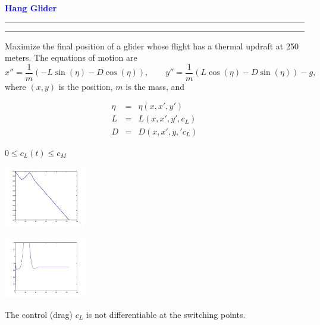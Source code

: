 \documentclass{seminar}
\newcommand{\redstripe}{\textcolor{red}{\hrule height 2.0pt\hfil}
             \vspace{-1.8pt}
             \textcolor{red}{\hrule height 1.0pt\hfil}
}
\newcommand{\heading}[1]{%
   \centerline{\textcolor{blue}{\textbf{#1}}}%
    \redstripe%
    \bigskip
}
\begin{document}
\begin{slide}

\heading{Hang Glider}

Maximize the final position of a glider whose flight has
a thermal updraft at 250 meters.
The equations of motion are
\[
x''  =  \frac{1}{m}(-L\sin (\eta )-D\cos (\eta )) , \qquad
y''  =  \frac{1}{m}(L\cos (\eta )-D\sin (\eta )) - g ,
\]
where $ ( x, y ) $ is the position, $m$ is the mass, and

\begin{minipage}[b]{.30\linewidth}
\begin{small}
\begin{eqnarray*}
\eta &=& \eta (x,x',y') \\
L    &=& L(x,x',y',c_L) \\
D    &=& D(x,x',y,'c_L) 
\end{eqnarray*}
\centerline{$ 0 \le c_L(t) \le c_M $}
\end{small}
\end{minipage} 
\hfil 
\begin{minipage}[b]{.30\linewidth}
\centerline{\includegraphics[width=1.4in]{../images/glider_x2}}
\end{minipage}
\hfil
\begin{minipage}[b]{.30\linewidth}
\centerline{\includegraphics[width=1.4in]{../images/glider_cl}}
\end{minipage}

The control  (drag) $ c_L $ is not differentiable at the
switching points.

\vfill

\end{slide}
\end{document}

